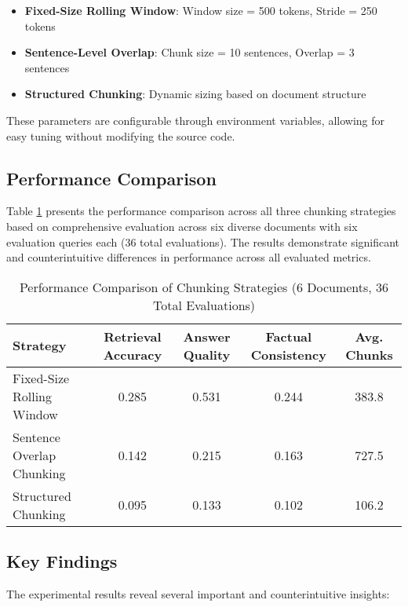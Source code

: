 \documentclass[11pt,a4paper]{article}
\begin{document}
\begin{itemize}
\item \textbf{Fixed-Size Rolling Window}: Window size = 500 tokens, Stride = 250 tokens
\item \textbf{Sentence-Level Overlap}: Chunk size = 10 sentences, Overlap = 3 sentences
\item \textbf{Structured Chunking}: Dynamic sizing based on document structure
\end{itemize}

These parameters are configurable through environment variables, allowing for easy tuning without modifying the source code.

\subsection{Performance Comparison}

Table \ref{tab:performance} presents the performance comparison across all three chunking strategies based on comprehensive evaluation across six diverse documents with six evaluation queries each (36 total evaluations). The results demonstrate significant and counterintuitive differences in performance across all evaluated metrics.

\begin{table}[h]
\centering
\caption{Performance Comparison of Chunking Strategies (6 Documents, 36 Total Evaluations)}
\label{tab:performance}
\begin{tabular}{lcccc}
\toprule
\textbf{Strategy} & \textbf{Retrieval Accuracy} & \textbf{Answer Quality} & \textbf{Factual Consistency} & \textbf{Avg. Chunks} \\
\midrule
Fixed-Size Rolling Window & 0.285 & 0.531 & 0.244 & 383.8 \\
Sentence Overlap Chunking & 0.142 & 0.215 & 0.163 & 727.5 \\
Structured Chunking & 0.095 & 0.133 & 0.102 & 106.2 \\
\bottomrule
\end{tabular}
\end{table}

\subsection{Key Findings}

The experimental results reveal several important and counterintuitive insights:
\end{document}

